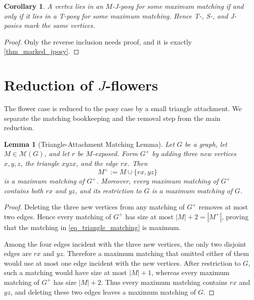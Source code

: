 \documentclass[preprint,12pt]{elsarticle}
\theoremstyle{plain}
\newtheorem{lemma}[theorem]{Lemma}
\newtheorem{corollary}[theorem]{Corollary}
\begin{document}
\begin{corollary}\label{cor_posy_invariance}
A vertex lies in an $M$-J-posy for some maximum matching if and only if it lies in a T-posy for some maximum matching.  Hence T-, S-, and J-posies mark the same vertices.
\end{corollary}

\begin{proof}
Only the reverse inclusion needs proof, and it is exactly
\cref{thm_marked_jposy}.
\end{proof}

\section{Reduction of \(J\)-flowers}\label{sec_flower_reduction}

The flower case is reduced to the posy case by a small triangle attachment.
We separate the matching bookkeeping and the removal step from the main
reduction.

\begin{lemma}[Triangle-Attachment Matching Lemma]
\label{lem_triangle_attachment_matching}
Let \(G\) be a graph, let \(M\in\mathcal M(G)\), and let \(r\) be
\(M\)-exposed. Form \(G^+\) by adding three new vertices \(x,y,z\), the
triangle \(xyzx\), and the edge \(rx\). Then
\begin{equation}\label{eq_triangle_matching}
M^+:=M\cup\{rx,yz\}
\end{equation}
is a maximum matching of \(G^+\). Moreover, every maximum matching of
\(G^+\) contains both \(rx\) and \(yz\), and its restriction to \(G\) is a
maximum matching of \(G\).
\end{lemma}

\begin{proof}
Deleting the three new vertices from any matching of \(G^+\) removes at most
two edges. Hence every matching of \(G^+\) has size at most
\(|M|+2=|M^+|\), proving that the matching in
\cref{eq_triangle_matching} is maximum.

Among the four edges incident with the three new vertices, the only two
disjoint edges are \(rx\) and \(yz\). Therefore a maximum matching that
omitted either of them would use at most
one edge incident with the new vertices. After restriction to \(G\), such a
matching would have size at most \(|M|+1\), whereas every maximum matching of
\(G^+\) has size \(|M|+2\). Thus every maximum matching contains \(rx\) and
\(yz\), and deleting these two edges leaves a maximum matching of \(G\).
\end{proof}
\end{document}
